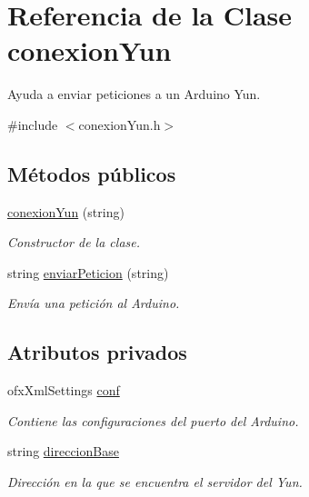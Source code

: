 \hypertarget{classconexion_yun}{}\section{Referencia de la Clase conexion\+Yun}
\label{classconexion_yun}


Ayuda a enviar peticiones a un Arduino Yun.  




{\ttfamily \#include $<$conexion\+Yun.\+h$>$}

\subsection*{Métodos públicos}
\begin{DoxyCompactItemize}
\item 
\hyperlink{classconexion_yun_a80ad58e0e5786d86f6c710eda070eca8}{conexion\+Yun} (string)
\begin{DoxyCompactList}\small\item\em Constructor de la clase. \end{DoxyCompactList}\item 
string \hyperlink{classconexion_yun_aa1b77a6e64ad90c36a750a0716582d53}{enviar\+Peticion} (string)
\begin{DoxyCompactList}\small\item\em Envía una petición al Arduino. \end{DoxyCompactList}\end{DoxyCompactItemize}
\subsection*{Atributos privados}
\begin{DoxyCompactItemize}
\item 
ofx\+Xml\+Settings \hyperlink{classconexion_yun_a18a59e3f193febe142a087cc6d8d6259}{conf}
\begin{DoxyCompactList}\small\item\em Contiene las configuraciones del puerto del Arduino. \end{DoxyCompactList}\item 
string \hyperlink{classconexion_yun_a120483618dae395e425290a6fbc669f6}{direccion\+Base}
\begin{DoxyCompactList}\small\item\em Dirección en la que se encuentra el servidor del Yun. \end{DoxyCompactList}\end{DoxyCompactItemize}


